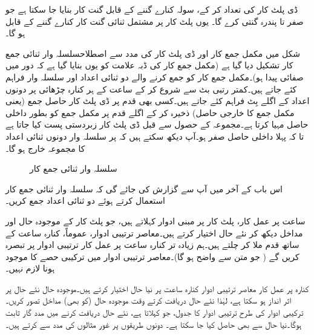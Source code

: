 ڈی پلٹ کار کی تعداد  کر کے،  سولہ   کنارے گننے   کے قابل گنت کار بنایا جا سکتا  ہے جو    صفر   تا  پندرہ   گنتی کرے گا۔ یوں  پلٹ کار  پر مشتمل ثنائی گنت کار  کنارے گننے کے قابل ہو گا۔ 



شکل    میں مکمل جمع کار  اور ڈی پلٹ کار   کی مدد سے اصطلاح{سلسلہ وار ثنائی جمع کار}   تشکیل دیا گیا ہے (مکمل جمع کار کی ڈبہ علامت کو یوں بنایا گیا ہے کہ دور  میں صفائی  پیدا ہو)۔مکمل جمع کار کو جمع کرنے والے دو  ثنائی اعداد   اور  سلسلہ وار فراہم کئے جاتے ہیں۔کمتر رتبی  بٹ سے شروع کر کے ساعت کے ہر  کنارہ چڑھائی پر دونوں اعداد کے اگلے بِٹ فراہم کئے جاتے ہیں۔کسی بھی قدم پر ڈی پلٹ کار حاصل جمع (یعنی مکمل جمع کا خارجی حاصل)   ذخیرہ کر کے  اگلے قدم پر  مکمل جمع کو بطور داخلی حاصل مہیا کرتا ہے۔مجموعہ  کے حصول  سے قبل ڈی پلٹ کار  زبردستی پست کیا جاتا ہے تا کہ پہلا داخلی حاصل صفر ہو۔آپ دیکھ سکتے ہیں کہ  پر سلسلہ وار دونوں ثنائی اعداد کا مجموعہ خارج ہو گا۔ 
\begin{figure}
\centering
{}
\caption{سلسلہ وار ثنائی جمع کار}
\label{شکل_ترتیبی_ثنائی_سلسلہ_وار_جمع_کار}
\end{figure}

اس باب کے آخر میں آپ سے گزارش کی جائے گی کہ سلسلہ وار ثنائی جمع کار  استعمال کرتے ہوئے دو ثنائی اعداد جمع کریں۔

ساعت  پر عمل کار،   پلٹ کار  پر مبنی ادوار   کہلاتے ہیں، جو  پلٹ کار کے موجودہ حال اور مداخل  دیکھ کر  نئے حال اختیار کرتے ہیں۔معاصر ترتیبی ادوار، عموماً،  کنارہ ساعت  کے ساتھ قدم ملا کر چلتے ہیں۔ہم زیادہ تر کنارہ ساعت پر عمل کار ترتیبی ادوار پر تبصرہ کریں گے ( جو متن سے واضح ہو گا)۔معاصر ترتیبی ادوار میں ترکیبی حصے کا موجود ہونا لازم نہیں۔

کنارہ پر عمل کار معاصر ترتیبی ادوار  کنارہ ساعت پر نیا حال اختیار کرتے ہیں۔موجودہ حال  نئے  حال پر اثر انداز ہو سکتا ہے، لہٰذا    نئے  حال دریافت کرتے وقت موجودہ حال (کو بھی) مداخل تصور کریں۔ترکیبی ادوار کی طرح ترتیبی ادوار کا جدول،  جو    کہلاتا ہے،  نئے حال دریافت کرنے میں  مدد گار ثابت ہوگا۔نیا   حال      سے بھی حاصل کیا جا سکتا ہے۔ دونوں طریقوں پر غور  مثالوں کی مدد سے کرتے ہیں۔

